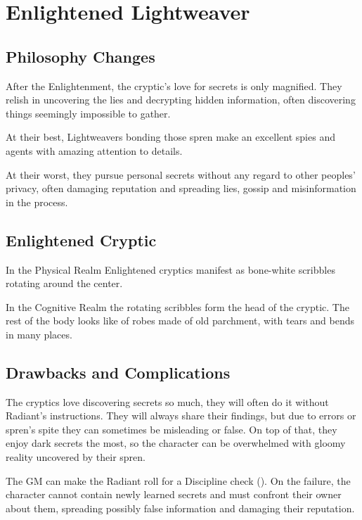 \section{Enlightened Lightweaver}


\subsection{Philosophy Changes}

After the Enlightenment, the cryptic's love for secrets is only magnified. They relish in uncovering the lies and decrypting hidden information, often discovering things seemingly impossible to gather.

At their best, Lightweavers bonding those spren make an excellent spies and agents with amazing attention to details.

At their worst, they pursue personal secrets without any regard to other peoples' privacy, often damaging reputation and spreading lies, gossip and misinformation in the process.

\subsection{Enlightened Cryptic}

In the Physical Realm Enlightened cryptics manifest as bone-white scribbles rotating around the center.

In the Cognitive Realm the rotating scribbles form the head of the cryptic. The rest of the body looks like of robes made of old parchment, with tears and bends in many places.

\subsection{Drawbacks and Complications}

The cryptics love discovering secrets so much, they will often do it without Radiant's instructions. They will always share their findings, but due to errors or spren's spite they can sometimes be misleading or false. On top of that, they enjoy dark secrets the most, so the character can be overwhelmed with gloomy reality uncovered by their spren.

The GM can make the Radiant roll for a Discipline check (\corruptedResistanceDC{}). On the failure, the character cannot contain newly learned secrets and must confront their owner about them, spreading possibly false information and damaging their reputation.


